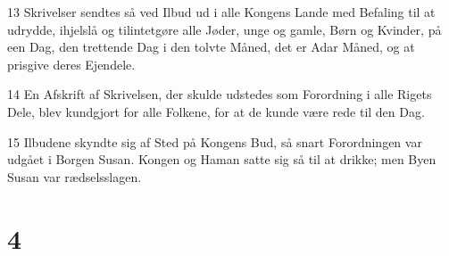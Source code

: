 \par 13 Skrivelser sendtes så ved Ilbud ud i alle Kongens Lande med Befaling til at udrydde, ihjelslå og tilintetgøre alle Jøder, unge og gamle, Børn og Kvinder, på een Dag, den trettende Dag i den tolvte Måned, det er Adar Måned, og at prisgive deres Ejendele.
\par 14 En Afskrift af Skrivelsen, der skulde udstedes som Forordning i alle Rigets Dele, blev kundgjort for alle Folkene, for at de kunde være rede til den Dag.
\par 15 Ilbudene skyndte sig af Sted på Kongens Bud, så snart Forordningen var udgået i Borgen Susan. Kongen og Haman satte sig så til at drikke; men Byen Susan var rædselsslagen.

\chapter{4}

